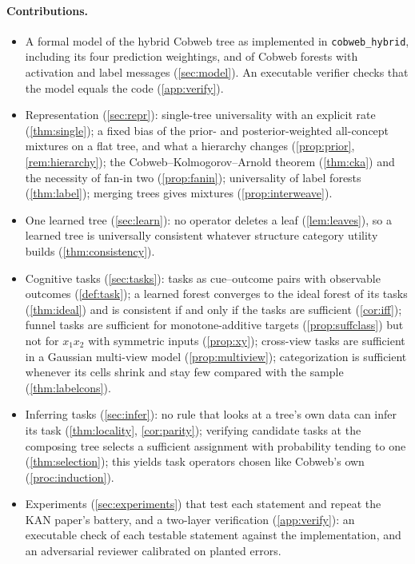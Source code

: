 \documentclass[11pt]{article}
\theoremstyle{definition}
\theoremstyle{remark}
\begin{document}
\paragraph{Contributions.}
\begin{itemize}[leftmargin=*]
\item A formal model of the hybrid Cobweb tree as implemented in
  \texttt{cobweb\_hybrid}, including its four prediction weightings, and of Cobweb
  forests with activation and label messages (\cref{sec:model}).  An executable verifier
  checks that the model equals the code (\cref{app:verify}).
\item Representation (\cref{sec:repr}): single-tree universality with an explicit
  rate (\cref{thm:single}); a fixed bias of the prior- and posterior-weighted
  all-concept mixtures on a flat tree, and what a hierarchy changes (\cref{prop:prior},
  \cref{rem:hierarchy}); the Cobweb--Kolmogorov--Arnold theorem (\cref{thm:cka}) and the
  necessity of fan-in two (\cref{prop:fanin}); universality of label forests
  (\cref{thm:label}); merging trees gives mixtures (\cref{prop:interweave}).
\item One learned tree (\cref{sec:learn}): no operator deletes a leaf
  (\cref{lem:leaves}), so a learned tree is universally consistent whatever structure
  category utility builds (\cref{thm:consistency}).
\item Cognitive tasks (\cref{sec:tasks}): tasks as cue--outcome pairs with observable
  outcomes (\cref{def:task}); a learned forest converges to the ideal forest of its tasks
  (\cref{thm:ideal}) and is consistent if and only if the tasks are sufficient
  (\cref{cor:iff}); funnel tasks are sufficient for monotone-additive targets
  (\cref{prop:suffclass}) but not for $x_1x_2$ with symmetric inputs (\cref{prop:xy});
  cross-view tasks are sufficient in a Gaussian multi-view model (\cref{prop:multiview});
  categorization is sufficient whenever its cells shrink and stay few compared with the
  sample (\cref{thm:labelcons}).
\item Inferring tasks (\cref{sec:infer}): no rule that looks at a tree's own data can
  infer its task (\cref{thm:locality}, \cref{cor:parity}); verifying candidate tasks at
  the composing tree selects a sufficient assignment with probability tending to one
  (\cref{thm:selection}); this yields task operators chosen like Cobweb's own
  (\cref{proc:induction}).
\item Experiments (\cref{sec:experiments}) that test each statement and repeat the KAN
  paper's battery, and a two-layer verification (\cref{app:verify}): an executable check
  of each testable statement against the implementation, and an adversarial reviewer
  calibrated on planted errors.
\end{itemize}
\end{document}
